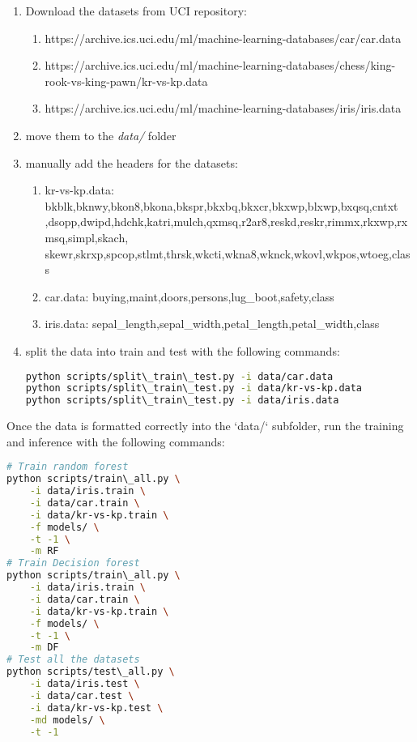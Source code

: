 \begin{enumerate}
  \item Download the datasets from UCI repository:
  \begin{enumerate}
    \item https://archive.ics.uci.edu/ml/machine-learning-databases/car/car.data
    \item https://archive.ics.uci.edu/ml/machine-learning-databases/chess/king-rook-vs-king-pawn/kr-vs-kp.data
    \item https://archive.ics.uci.edu/ml/machine-learning-databases/iris/iris.data
  \end{enumerate}
  \item move them to the \textit{data/} folder
  \item manually add the headers for the datasets:
  \begin{enumerate}
    \item kr-vs-kp.data: bkblk,bknwy,bkon8,bkona,bkspr,bkxbq,bkxcr,bkxwp,blxwp,bxqsq,cntxt\\,dsopp,dwipd,hdchk,katri,mulch,qxmsq,r2ar8,reskd,reskr,rimmx,rkxwp,rxmsq,simpl,skach,\\skewr,skrxp,spcop,stlmt,thrsk,wkcti,wkna8,wknck,wkovl,wkpos,wtoeg,class
    \item car.data: buying,maint,doors,persons,lug\_boot,safety,class
    \item iris.data: sepal\_length,sepal\_width,petal\_length,petal\_width,class
  \end{enumerate}
  \item split the data into train and test with the following commands:

\begin{lstlisting}[language=bash]
python scripts/split\_train\_test.py -i data/car.data
python scripts/split\_train\_test.py -i data/kr-vs-kp.data
python scripts/split\_train\_test.py -i data/iris.data
\end{lstlisting}

\end{enumerate}

Once the data is formatted correctly into the `data/` subfolder, run the training and inference with the following commands:

\begin{lstlisting}[language=bash]
# Train random forest
python scripts/train\_all.py \
    -i data/iris.train \
    -i data/car.train \
    -i data/kr-vs-kp.train \
    -f models/ \
    -t -1 \
    -m RF
# Train Decision forest
python scripts/train\_all.py \
    -i data/iris.train \
    -i data/car.train \
    -i data/kr-vs-kp.train \
    -f models/ \
    -t -1 \
    -m DF
# Test all the datasets
python scripts/test\_all.py \
    -i data/iris.test \
    -i data/car.test \
    -i data/kr-vs-kp.test \
    -md models/ \
    -t -1
\end{lstlisting}

